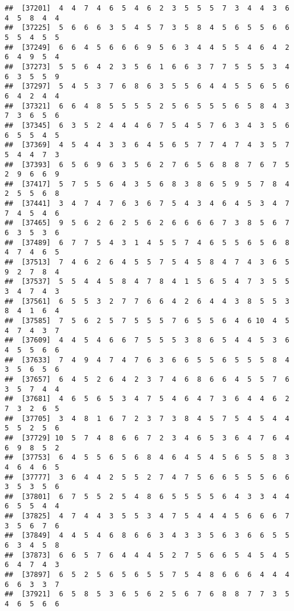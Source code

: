 \documentclass[
]{book}
\begin{document}
\begin{verbatim}
##  [37201]  4  4  7  4  6  5  4  6  2  3  5  5  5  7  3  4  4  3  6  4  5  8  4  4
##  [37225]  5  6  6  6  3  5  4  5  7  3  5  8  4  5  6  5  5  6  6  5  5  4  5  5
##  [37249]  6  6  4  5  6  6  6  9  5  6  3  4  4  5  5  4  6  4  2  6  4  9  5  4
##  [37273]  5  5  6  4  2  3  5  6  1  6  6  3  7  7  5  5  5  3  4  6  3  5  5  9
##  [37297]  5  4  5  3  7  6  8  6  3  5  5  6  4  4  5  5  6  5  6  6  4  2  4  4
##  [37321]  6  6  4  8  5  5  5  5  2  5  6  5  5  5  6  5  8  4  3  7  3  6  5  6
##  [37345]  6  3  5  2  4  4  4  6  7  5  4  5  7  6  3  4  3  5  6  6  5  5  4  5
##  [37369]  4  5  4  4  3  3  6  4  5  6  5  7  7  4  7  4  3  5  7  5  4  4  7  3
##  [37393]  6  5  6  9  6  3  5  6  2  7  6  5  6  8  8  7  6  7  5  2  9  6  6  9
##  [37417]  5  7  5  5  6  4  3  5  6  8  3  8  6  5  9  5  7  8  4  2  5  5  6  8
##  [37441]  3  4  7  4  7  6  3  6  7  5  4  3  4  6  4  5  3  4  7  7  4  5  4  6
##  [37465]  9  5  6  2  6  2  5  6  2  6  6  6  6  7  3  8  5  6  7  6  3  5  3  6
##  [37489]  6  7  7  5  4  3  1  4  5  5  7  4  6  5  5  6  5  6  8  4  7  4  6  5
##  [37513]  7  4  6  2  6  4  5  5  7  5  4  5  8  4  7  4  3  6  5  9  2  7  8  4
##  [37537]  5  5  4  4  5  8  4  7  8  4  1  5  6  5  4  7  3  5  5  3  4  7  4  3
##  [37561]  6  5  5  3  2  7  7  6  6  4  2  6  4  4  3  8  5  5  3  8  4  1  6  4
##  [37585]  7  5  6  2  5  7  5  5  5  7  6  5  5  6  4  6 10  4  5  4  7  4  3  7
##  [37609]  4  4  5  4  6  6  7  5  5  5  3  8  6  5  4  4  5  3  6  4  5  5  6  6
##  [37633]  7  4  9  4  7  4  7  6  3  6  6  5  5  6  5  5  5  8  4  3  5  6  5  6
##  [37657]  6  4  5  2  6  4  2  3  7  4  6  8  6  6  4  5  5  7  6  3  5  7  4  4
##  [37681]  4  6  5  6  5  3  4  7  5  4  6  4  7  3  6  4  4  6  2  7  3  2  6  5
##  [37705]  3  4  8  1  6  7  2  3  7  3  8  4  5  7  5  4  5  4  4  5  5  2  5  6
##  [37729] 10  5  7  4  8  6  6  7  2  3  4  6  5  3  6  4  7  6  4  6  9  8  5  2
##  [37753]  6  4  5  5  6  5  6  8  4  6  4  5  4  5  6  5  5  8  3  4  6  4  6  5
##  [37777]  3  6  4  4  2  5  5  2  7  4  7  5  6  6  5  5  5  6  6  3  5  3  5  6
##  [37801]  6  7  5  5  2  5  4  8  6  5  5  5  5  6  4  3  3  4  4  6  5  5  4  4
##  [37825]  4  7  4  4  3  5  5  3  4  7  5  4  4  4  5  6  6  6  7  3  5  6  7  6
##  [37849]  4  4  5  4  6  8  6  6  3  4  3  3  5  6  3  6  6  5  5  6  3  4  5  8
##  [37873]  6  6  5  7  6  4  4  4  5  2  7  5  6  6  5  4  5  4  5  6  4  7  4  3
##  [37897]  6  5  2  5  6  5  6  5  5  7  5  4  8  6  6  6  4  4  4  6  6  3  3  7
##  [37921]  6  5  8  5  3  6  5  6  2  5  6  7  6  8  8  7  7  3  5  4  6  5  6  6

\end{verbatim}
\end{document}
